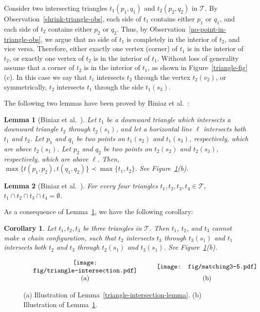 \documentclass[11pt,a4paper]{article}
\newcommand{\tra}[2]{{#1}({#2})}
\newtheorem{lemma}{Lemma}
\newtheorem{corollary}{Corollary}
\begin{document}
Consider two intersecting triangles $t_1(p_1,q_1)$ and $t_2(p_2,q_2)$ in $\mathcal{T}$. By Observation~\ref{shrink-triangle-obs}, each side of $t_1$ contains either $p_1$ or $q_1$, and each side of $t_2$ contains either $p_2$ or $q_2$. Thus, by Observation~\ref{no-point-in-triangle-obs}, we argue that no side of $t_1$ is completely in the interior of $t_2$, and vice versa. Therefore, either exactly one vertex (corner) of $t_1$ is in the interior of $t_2$, or exactly one vertex of $t_2$ is in the interior of $t_1$. Without loss of generality assume that a corner of $t_2$ is in the interior of $t_1$, as shown in Figure~\ref{triangle-fig}(c). In this case we say that $t_1$ intersects $t_2$ through the vertex $t_2(v_2)$, or symmetrically, $t_2$ intersects $t_1$ through the side $t_1(s_3)$. 


The following two lemmas have been proved by Biniaz et al.~\cite{Biniaz2015}:
\begin{lemma}[Biniaz et al.~\cite{Biniaz2015}]
\label{triangle3}
Let $t_1$ be a downward triangle which intersects a downward triangle $t_2$ through $\tra{t_2}{s_1}$, and let a horizontal line $\ell$ intersects both $t_1$ and $t_2$. Let $p_1$ and $q_1$ be two points on $t_1(s_2)$ and $t_1(s_3)$, respectively, which are above $t_2(s_1)$. Let $p_2$ and $q_2$ be two points on $t_2(s_2)$ and $t_2(s_3)$, respectively, which are above $\ell$. Then, $\max\{t(p_1,p_2), t(q_1,q_2)\} \prec \max\{t_1,t_2\}$. See Figure~\ref{triangle-intersection-fig}(b).
\end{lemma}

\begin{lemma}[Biniaz et al.~\cite{Biniaz2015}]
\label{intersection-lemma}
For every four triangles $t_1,t_2,t_3,t_4\in \mathcal{T}$, $t_1\cap t_2\cap t_3\cap t_4 =\emptyset$. 
\end{lemma}

As a consequence of Lemma~\ref{triangle3}, we have the following corollary:
\begin{corollary}
\label{biniaz-cor}
 Let $t_1, t_2, t_3$ be three triangles in $\mathcal{T}$. Then $t_1$, $t_2$, and $t_3$ cannot make a chain configuration, such that $t_2$ intersects $t_3$ through $t_3(s_1)$ and $t_1$ intersects both $t_2$ and $t_3$ through $t_2(s_1)$ and $t_3(s_1)$. See Figure~\ref{triangle-intersection-fig}(b).
\end{corollary}


\begin{figure}[htb]
  \centering
\setlength{\tabcolsep}{0in}
  $\begin{tabular}{cc}
\multicolumn{1}{m{.5\columnwidth}}{\centering\texttt{[image: fig/triangle-intersection.pdf]}}
&\multicolumn{1}{m{.5\columnwidth}}{\centering\texttt{[image: fig/matching3-5.pdf]}} 
\\(a)&(b)
\end{tabular}$
  \caption{(a) Illustration of Lemma~\ref{triangle-intersection-lemma}. (b) Illustration of Lemma~\ref{triangle3}.}
  \label{triangle-intersection-fig}
\end{figure}
\end{document}
